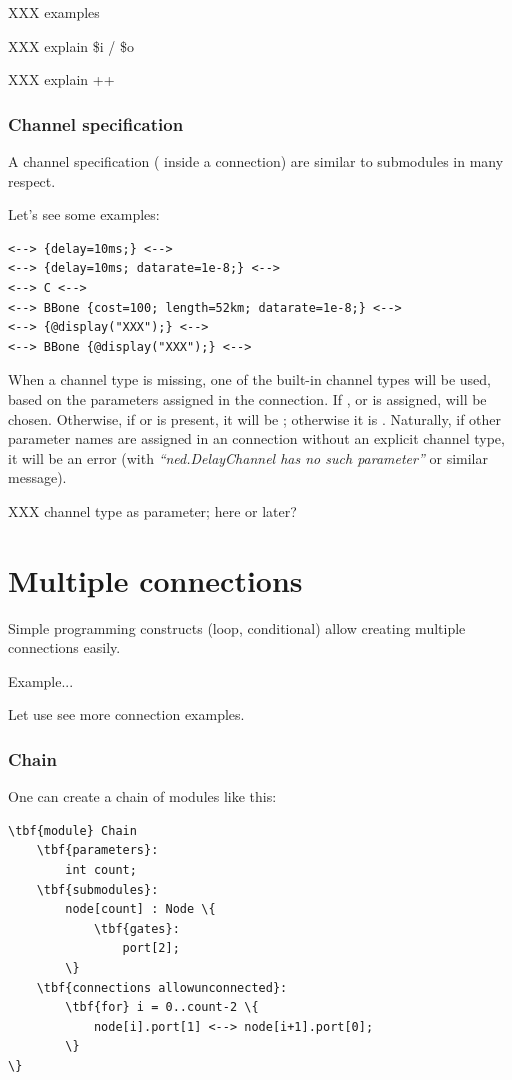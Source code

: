 XXX examples

XXX explain \$i / \$o

XXX explain ++


\subsubsection{Channel specification}

A channel specification ( inside a connection)
are similar to submodules in many respect.

Let's see some examples:

\begin{Verbatim}
<--> {delay=10ms;} <-->
<--> {delay=10ms; datarate=1e-8;} <-->
<--> C <-->
<--> BBone {cost=100; length=52km; datarate=1e-8;} <-->
<--> {@display("XXX");} <-->
<--> BBone {@display("XXX");} <-->
\end{Verbatim}


When a channel type is missing, one of the built-in channel types will be
used, based on the parameters assigned in the connection. If
,  or  is assigned,
 will be chosen. Otherwise, if  or
 is present, it will be ; otherwise it
is . Naturally, if other parameter names are
assigned in an connection without an explicit channel type, it will be an error
(with \textit{``ned.DelayChannel has no such parameter''} or similar message).

XXX channel type as parameter; here or later?


\section{Multiple connections}
\label{sec:ch-ned-lang:multiple-connections}

Simple programming constructs (loop, conditional) allow creating
multiple connections easily.

Example...

Let use see more connection examples.

\subsubsection{Chain}

One can create a chain of modules like this:

\begin{Verbatim}[commandchars=\\\{\}]
\tbf{module} Chain
    \tbf{parameters}:
        int count;
    \tbf{submodules}:
        node[count] : Node \{
            \tbf{gates}:
                port[2];
        \}
    \tbf{connections allowunconnected}:
        \tbf{for} i = 0..count-2 \{
            node[i].port[1] <--> node[i+1].port[0];
        \}
\}
\end{Verbatim}


